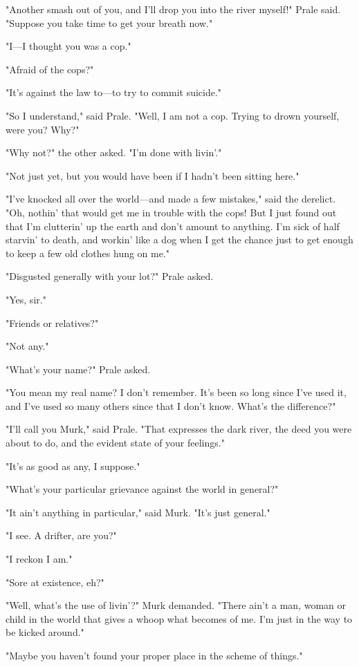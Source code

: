 \documentclass{novel}
\begin{document}
"Another smash out of you, and I'll drop you into the river myself!" Prale said. "Suppose you take time to get your breath now."

"I---I thought you was a cop."

"Afraid of the cops?"

"It's against the law to---to try to commit suicide."

"So I understand," said Prale. "Well, I am not a cop. Trying to drown yourself, were you? Why?"

"Why not?" the other asked. "I'm done with livin'."

"Not just yet, but you would have been if I hadn't been sitting here."

"I've knocked all over the world---and made a few mistakes," said the derelict. "Oh, nothin' that would get me in trouble with the cops! But I just found out that I'm clutterin' up the earth and don't amount to anything. I'm sick of half starvin' to death, and workin' like a dog when I get the chance just to get enough to keep a few old clothes hung on me."

"Disgusted generally with your lot?" Prale asked.

"Yes, sir."

"Friends or relatives?"

"Not any."

"What's your name?" Prale asked.

"You mean my real name? I don't remember. It's been so long since I've used it, and I've used so many others since that I don't know. What's the difference?"

"I'll call you Murk," said Prale. "That expresses the dark river, the deed you were about to do, and the evident state of your feelings."

"It's as good as any, I suppose."

"What's your particular grievance against the world in general?"

"It ain't anything in particular," said Murk. "It's just general."

"I see. A drifter, are you?"

"I reckon I am."

"Sore at existence, eh?"

"Well, what's the use of livin'?" Murk demanded. "There ain't a man, woman or child in the world that gives a whoop what becomes of me. I'm just in the way to be kicked around."

"Maybe you haven't found your proper place in the scheme of things."
\end{document}

